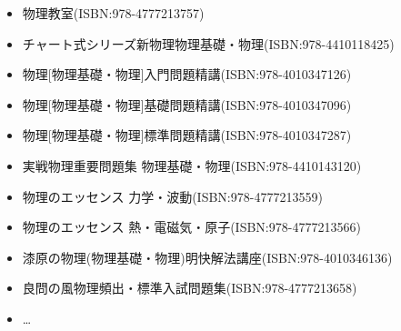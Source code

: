 \begin{itemize}
    \item 物理教室(ISBN:978-4777213757)
    \item チャート式シリーズ新物理物理基礎・物理(ISBN:978-4410118425)
    \item 物理[物理基礎・物理]入門問題精講(ISBN:978-4010347126)
    \item 物理[物理基礎・物理]基礎問題精講(ISBN:978-4010347096)
    \item 物理[物理基礎・物理]標準問題精講(ISBN:978-4010347287)
    \item 実戦物理重要問題集 物理基礎・物理(ISBN:978-4410143120)
    \item 物理のエッセンス 力学・波動(ISBN:978-4777213559)
    \item 物理のエッセンス 熱・電磁気・原子(ISBN:978-4777213566)
    \item 漆原の物理(物理基礎・物理)明快解法講座(ISBN:978-4010346136)
    \item 良問の風物理頻出・標準入試問題集(ISBN:978-4777213658)
    \item \ldots
\end{itemize}
